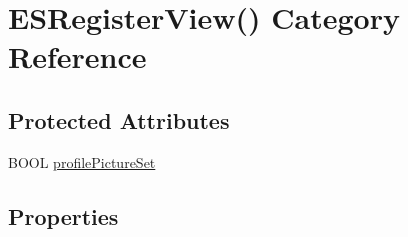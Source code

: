 \hypertarget{category_e_s_register_view_07_08}{}\section{E\+S\+Register\+View() Category Reference}
\label{category_e_s_register_view_07_08}
\subsection*{Protected Attributes}
\begin{DoxyCompactItemize}
\item 
B\+O\+O\+L \hyperlink{category_e_s_register_view_07_08_a5e650ac6588badca3144b5ce0ed3ec54}{profile\+Picture\+Set}
\end{DoxyCompactItemize}
\subsection*{Properties}
